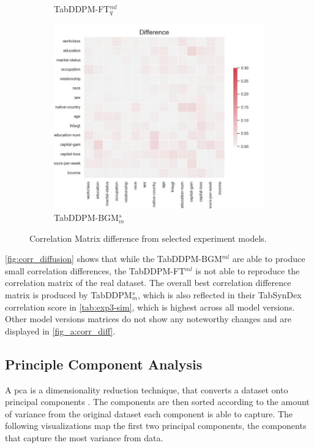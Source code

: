 \begin{figure}[h]
\begin{subfigure}{0.3\textwidth}
		\caption{TabDDPM-FT$^{ml}_q$}
	\end{subfigure}
	\hfill
	\begin{subfigure}{0.3\textwidth}
		\includegraphics[width=\textwidth]{images/correlation_difference/tab-ddpm-bgm-simTune-minmax.jpg}
		\caption{TabDDPM-BGM$^{s}_m$}
	\end{subfigure}
	\caption{Correlation Matrix difference from selected experiment models.}
	\label{fig:corr_diffusion}
\end{figure}



\autoref{fig:corr_diffusion} shows that while the TabDDPM-BGM$^{ml}$ are able to produce small correlation differences, the TabDDPM-FT$^{ml}$ is not able to reproduce
the correlation matrix of the real dataset.
The overall best correlation difference matrix is produced by TabDDPM$^{s}_m$, which is also reflected in their TabSynDex correlation score in \autoref{tab:exp3-sim}, which is highest across all model versions.
Other model versions matrices do not show any noteworthy changes and are displayed in \autoref{fig_a:corr_diff}.

\subsection[]{Principle Component Analysis}
\label{ch:results-pca}

A \gls{pca} is a dimensionality reduction technique, that converts a dataset onto principal components \cite{brenninkmeijer2019GenerationEvaluationTabular}.
The components are then sorted according to the amount of variance from the original dataset each component is able to capture.
The following visualizations map the first two principal components, \ie the components that capture the most variance from data.


